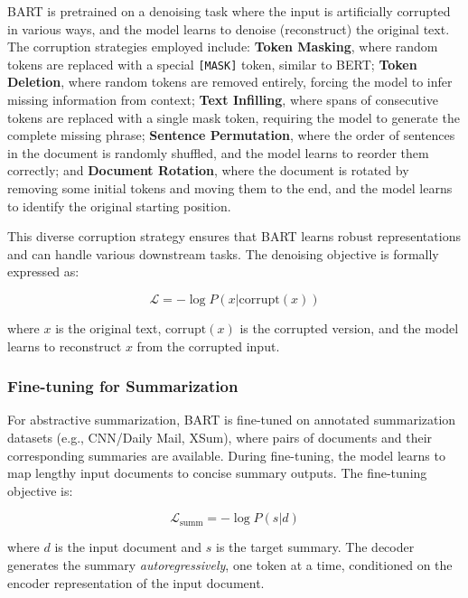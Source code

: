 \gls{BART} is pretrained on a denoising task where the input is artificially corrupted in various ways, and the model learns to denoise (reconstruct) the original text. The corruption strategies employed include: \textbf{Token Masking}, where random tokens are replaced with a special \texttt{[MASK]} token, similar to \gls{BERT}; \textbf{Token Deletion}, where random tokens are removed entirely, forcing the model to infer missing information from context; \textbf{Text Infilling}, where spans of consecutive tokens are replaced with a single mask token, requiring the model to generate the complete missing phrase; \textbf{Sentence Permutation}, where the order of sentences in the document is randomly shuffled, and the model learns to reorder them correctly; and \textbf{Document Rotation}, where the document is rotated by removing some initial tokens and moving them to the end, and the model learns to identify the original starting position.

This diverse corruption strategy ensures that \gls{BART} learns robust representations and can handle various downstream tasks. The denoising objective is formally expressed as:

\begin{equation}
    \mathcal{L} = -\log P(x | \text{corrupt}(x))
\end{equation}

where $x$ is the original text, $\text{corrupt}(x)$ is the corrupted version, and the model learns to reconstruct $x$ from the corrupted input.

\subsubsection{Fine-tuning for Summarization}

For abstractive summarization, \gls{BART} is fine-tuned on annotated summarization datasets (e.g., CNN/Daily Mail, XSum), where pairs of documents and their corresponding summaries are available. During fine-tuning, the model learns to map lengthy input documents to concise summary outputs. The fine-tuning objective is:

\begin{equation}
    \mathcal{L}_{\text{summ}} = -\log P(s | d)
\end{equation}

where $d$ is the input document and $s$ is the target summary. The decoder generates the summary\textit{ autoregressively}, one token at a time, conditioned on the encoder representation of the input document.

